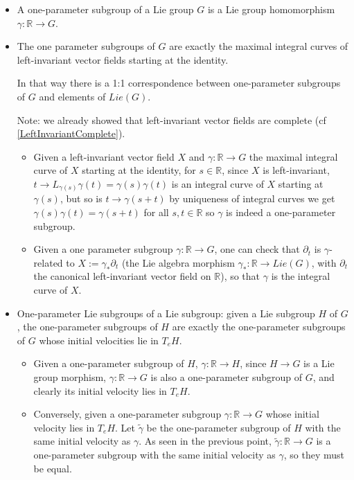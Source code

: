 \documentclass{report}
\theoremstyle{definition}
\begin{document}
\begin{itemize}
    \item A one-parameter subgroup of a Lie group $G$ is a Lie group homomorphism $\gamma:\mathbb{R}\to G$.
    \item The one parameter subgroups of $G$ are exactly the maximal integral curves of left-invariant vector fields starting at the identity.

    In that way there is a 1:1 correspondence between one-parameter subgroups of $G$ and elements of $Lie(G)$.

    Note: we already showed that left-invariant vector fields are complete (cf \ref{LeftInvariantComplete}).
    \begin{itemize}
        \item Given a left-invariant vector field $X$ and $\gamma:\mathbb{R}\to G$ the maximal integral curve of $X$ starting at the identity, for $s\in\mathbb{R}$, since $X$ is left-invariant, $t\to L_{\gamma(s)}\gamma(t)=\gamma(s)\gamma(t)$ is an integral curve of $X$ starting at $\gamma(s)$, but so is $t\to \gamma(s+t)$ by uniqueness of integral curves we get $\gamma(s)\gamma(t)=\gamma(s+t)$ for all $s,t\in\mathbb{R}$ so $\gamma$ is indeed a one-parameter subgroup.
        \item Given a one parameter subgroup $\gamma:\mathbb{R}\to G$, one can check that $\partial_t$ is $\gamma$-related to $X:=\gamma_*\partial_t$ (the Lie algebra morphism $\gamma_*:\mathbb{R}\to Lie(G)$, with $\partial_t$ the canonical left-invariant vector field on $\mathbb{R}$), so that $\gamma$ is the integral curve of $X$.
    \end{itemize}
    \item One-parameter Lie subgroups of a Lie subgroup: given a Lie subgroup $H$ of $G$, the one-parameter subgroups of $H$ are exactly the one-parameter subgroups of $G$ whose initial velocities lie in $T_eH$.
    \begin{itemize}
        \item Given a one-parameter subgroup of $H$, $\gamma:\mathbb{R}\to H$, since $H\to G$ is a Lie group morphism, $\gamma:\mathbb{R}\to G$ is also a one-parameter subgroup of $G$, and clearly its initial velocity lies in $T_eH$.
        \item Conversely, given a one-parameter subgroup $\gamma:\mathbb{R}\to G$ whose initial velocity lies in $T_eH$. Let $\tilde{\gamma}$ be the one-parameter subgroup of $H$ with the same initial velocity as $\gamma$. As seen in the previous point, $\tilde{\gamma}:\mathbb{R}\to G$ is a one-parameter subgroup with the same initial velocity as $\gamma$, so they must be equal.
    \end{itemize}
\end{itemize}
\end{document}
